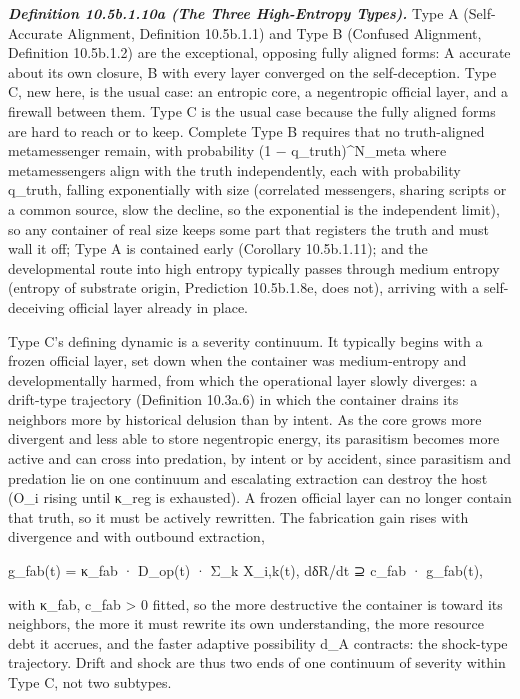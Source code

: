 \documentclass[
]{article}
\begin{document}
\emph{\textbf{Definition 10.5b.1.10a (The Three High-Entropy Types).}}
Type A (Self-Accurate Alignment, Definition 10.5b.1.1) and Type B
(Confused Alignment, Definition 10.5b.1.2) are the exceptional, opposing
fully aligned forms: A accurate about its own closure, B with every
layer converged on the self-deception. Type C, new here, is the usual
case: an entropic core, a negentropic official layer, and a firewall
between them. Type C is the usual case because the fully aligned forms
are hard to reach or to keep. Complete Type B requires that no
truth-aligned metamessenger remain, with probability (1 −
q\_truth)\^{}N\_meta where metamessengers align with the truth
independently, each with probability q\_truth, falling exponentially
with size (correlated messengers, sharing scripts or a common source,
slow the decline, so the exponential is the independent limit), so any
container of real size keeps some part that registers the truth and must
wall it off; Type A is contained early (Corollary 10.5b.1.11); and the
developmental route into high entropy typically passes through medium
entropy (entropy of substrate origin, Prediction 10.5b.1.8e, does not),
arriving with a self-deceiving official layer already in place.

Type C's defining dynamic is a severity continuum. It typically begins
with a frozen official layer, set down when the container was
medium-entropy and developmentally harmed, from which the operational
layer slowly diverges: a drift-type trajectory (Definition 10.3a.6) in
which the container drains its neighbors more by historical delusion
than by intent. As the core grows more divergent and less able to store
negentropic energy, its parasitism becomes more active and can cross
into predation, by intent or by accident, since parasitism and predation
lie on one continuum and escalating extraction can destroy the host
(O\_i rising until κ\_reg is exhausted). A frozen official layer can no
longer contain that truth, so it must be actively rewritten. The
fabrication gain rises with divergence and with outbound extraction,

g\_fab(t) = κ\_fab · D\_op(t) · Σ\_k X\_i,k(t), dδR/dt ⊇ c\_fab ·
g\_fab(t),

with κ\_fab, c\_fab \textgreater{} 0 fitted, so the more destructive the
container is toward its neighbors, the more it must rewrite its own
understanding, the more resource debt it accrues, and the faster
adaptive possibility d\_A contracts: the shock-type trajectory. Drift
and shock are thus two ends of one continuum of severity within Type C,
not two subtypes.
\end{document}
